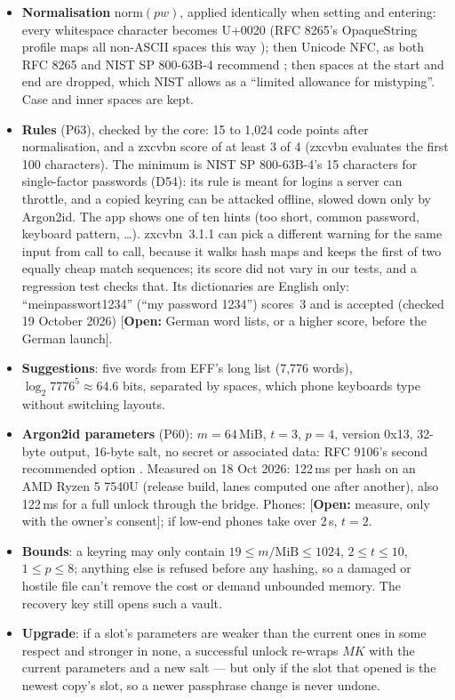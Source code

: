 \documentclass[11pt,a4paper]{article}
\newcommand{\todo}[1]{\textcolor{red!70!black}{[\textbf{Open:} #1]}}
\newcommand{\dref}[1]{\textsf{#1}} %
\begin{document}
\begin{itemize}
  \item \textbf{Normalisation} $\mathrm{norm}(pw)$, applied identically when setting and entering: every whitespace character becomes U+0020 (RFC 8265's OpaqueString profile maps all non-ASCII spaces this way \cite{rfc8265}); then Unicode NFC, as both RFC 8265 and NIST SP 800-63B-4 recommend \cite{sp80063b}; then spaces at the start and end are dropped, which NIST allows as a ``limited allowance for mistyping''. Case and inner spaces are kept.
  \item \textbf{Rules} (\dref{P63}), checked by the core: 15 to 1{,}024 code points after normalisation, and a zxcvbn score of at least 3 of 4 \cite{zxcvbn} (zxcvbn evaluates the first 100 characters). The minimum is NIST SP 800-63B-4's 15 characters for single-factor passwords (\dref{D54}): its rule is meant for logins a server can throttle, and a copied keyring can be attacked offline, slowed down only by Argon2id. The app shows one of ten hints (too short, common password, keyboard pattern, \ldots). zxcvbn~3.1.1 can pick a different warning for the same input from call to call, because it walks hash maps and keeps the first of two equally cheap match sequences; its score did not vary in our tests, and a regression test checks that. Its dictionaries are English only: ``meinpasswort1234'' (``my password 1234'') scores~3 and is accepted (checked 19 October 2026) \todo{German word lists, or a higher score, before the German launch}.
  \item \textbf{Suggestions}: five words from EFF's long list (7{,}776 words), $\log_2 7776^5 \approx 64.6$ bits, separated by spaces, which phone keyboards type without switching layouts.
  \item \textbf{Argon2id parameters} (\dref{P60}): $m = 64$\,MiB, $t = 3$, $p = 4$, version 0x13, 32-byte output, 16-byte salt, no secret or associated data: RFC 9106's second recommended option \cite{rfc9106}. Measured on 18 Oct 2026: 122\,ms per hash on an AMD Ryzen 5 7540U (release build, lanes computed one after another), also 122\,ms for a full unlock through the bridge. Phones: \todo{measure, only with the owner's consent}; if low-end phones take over 2\,s, $t = 2$.
  \item \textbf{Bounds}: a keyring may only contain $19 \le m/\mathrm{MiB} \le 1024$, $2 \le t \le 10$, $1 \le p \le 8$; anything else is refused before any hashing, so a damaged or hostile file can't remove the cost or demand unbounded memory. The recovery key still opens such a vault.
  \item \textbf{Upgrade}: if a slot's parameters are weaker than the current ones in some respect and stronger in none, a successful unlock re-wraps $MK$ with the current parameters and a new salt --- but only if the slot that opened is the newest copy's slot, so a newer passphrase change is never undone.
\end{itemize}
\end{document}
